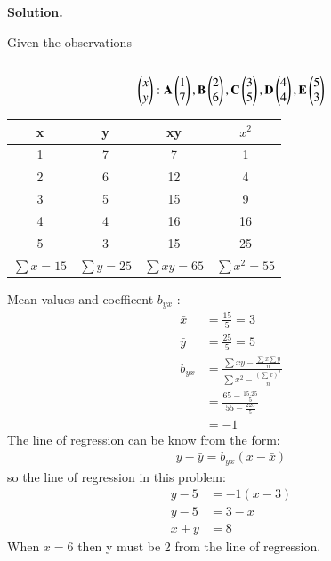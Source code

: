 \documentclass[journal,12pt,twocolumn]{IEEEtran}
\begin{document}
\textbf{Solution.}

Given the observations \\\\
\begin{align}
\begin{pmatrix}x \\y \end{pmatrix}:
\mathbf{A}\begin{pmatrix}1 \\7 \end{pmatrix},
\mathbf {B}\begin{pmatrix}2 \\6 \end{pmatrix},
\mathbf {C}\begin{pmatrix}3 \\5 \end{pmatrix},
 \mathbf {D}\begin{pmatrix}4 \\4 \end{pmatrix},
\mathbf {E}\begin{pmatrix}5 \\3 \end{pmatrix}
\end{align}
\begin{table}[H]
	\resizebox{\columnwidth}{!} {
		\begin{tabular}{|c|c|c|c|}
			\hline
			x & y & xy & $x^{2}$ \\
			\hline
			1 &  7 & 7  &1 \\
		
				2 &  6 & 12   &4 \\
			
				3 &  5 & 15  &9 \\
			
				4 &  4 & 16  &16 \\
			
				5 &  3 & 15  &25 \\
			\hline
			$\sum x=15$ &$\sum  y=25$ &$\sum xy=65$  &$\sum x^2=55$  \\
			\hline
		\end{tabular}
	}
\end{table}
Mean values and coefficent $b_{yx}$ :
\begin{align}
	\bar{x}&=\frac{15}{5}=3\\
	\bar{y}&=\frac{25}{5}=5\\
	b_{yx} &=\frac{\sum xy - \frac{\sum x \sum y}{n}}{\sum x^{2}- \frac {(\sum x)^{2}}{n} }\\
	&=\frac{65 -\frac{15.25}{5}}{55-\frac{225}{5}}\\
	&= -1 
\end{align}
The line of regression can be know from the form:
\begin{align}
	y-\bar{y}=b_{yx}(x-\bar{x})
\end{align}
so the line of regression in this problem:
\begin{align}
	y-5&=-1(x-3)\\
	y-5&=3-x\\
	x+y&=8
\end{align}
When $x=6$ then y must be 2 from the line of regression.
\end{document}
